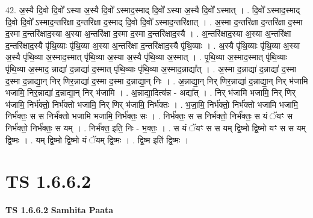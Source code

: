 \documentclass[17pt]{extarticle}
\begin{document}
42. अ॒स्यै दि॒वो दि॒वो᳚ ऽस्या अ॒स्यै दि॒वो᳚ ऽस्माद॒स्माद् दि॒वो᳚ ऽस्या अ॒स्यै दि॒वो᳚ ऽस्मात् । . दि॒वो᳚ ऽस्माद॒स्माद् दि॒वो दि॒वो᳚ ऽस्माद॒न्तरि॑क्षा द॒न्तरि॑क्षा द॒स्माद् दि॒वो दि॒वो᳚ ऽस्माद॒न्तरि॑क्षात् । . अ॒स्मा द॒न्तरि॑क्षा द॒न्तरि॑क्षा द॒स्मा द॒स्मा द॒न्तरि॑क्षाद॒स्या अ॒स्या अ॒न्तरि॑क्षा द॒स्मा द॒स्मा द॒न्तरि॑क्षाद॒स्यै । . अ॒न्तरि॑क्षाद॒स्या अ॒स्या अ॒न्तरि॑क्षा द॒न्तरि॑क्षाद॒स्यै पृ॑थि॒व्याः पृ॑थि॒व्या अ॒स्या अ॒न्तरि॑क्षा द॒न्तरि॑क्षाद॒स्यै पृ॑थि॒व्याः । . अ॒स्यै पृ॑थि॒व्याः पृ॑थि॒व्या अ॒स्या अ॒स्यै पृ॑थि॒व्या अ॒स्माद॒स्मात् पृ॑थि॒व्या अ॒स्या अ॒स्यै पृ॑थि॒व्या अ॒स्मात् । . पृ॒थि॒व्या अ॒स्माद॒स्मात् पृ॑थि॒व्याः पृ॑थि॒व्या अ॒स्माद॒ न्नाद्या॑ द॒न्नाद्या॑ द॒स्मात् पृ॑थि॒व्याः पृ॑थि॒व्या अ॒स्माद॒न्नाद्या᳚त् । . अ॒स्मा द॒न्नाद्या॑ द॒न्नाद्या॑ द॒स्मा द॒स्मा द॒न्नाद्या॒न् निर् णिर॒न्नाद्या॑ द॒स्मा द॒स्मा द॒न्नाद्या॒न् निः । . अ॒न्नाद्या॒न् निर् णिर॒न्नाद्या॑ द॒न्नाद्या॒न् निर् भ॑जामि भजामि॒ निर॒न्नाद्या॑ द॒न्नाद्या॒न् निर् भ॑जामि । . अ॒न्नाद्या॒दित्य॑न्न - अद्या᳚त् । . निर् भ॑जामि भजामि॒ निर् णिर् भ॑जामि॒ निर्भ॑क्तो॒ निर्भ॑क्तो भजामि॒ निर् णिर् भ॑जामि॒ निर्भ॑क्तः । . भ॒जा॒मि॒ निर्भ॑क्तो॒ निर्भ॑क्तो भजामि भजामि॒ निर्भ॑क्तः॒ स स निर्भ॑क्तो भजामि भजामि॒ निर्भ॑क्तः॒ सः । . निर्भ॑क्तः॒ स स निर्भ॑क्तो॒ निर्भ॑क्तः॒ स यं ॅयꣳ स निर्भ॑क्तो॒ निर्भ॑क्तः॒ स यम् । . निर्भ॑क्त॒ इति॒ निः - भ॒क्तः॒ । . स यं ॅयꣳ स स यम् द्वि॒ष्मो द्वि॒ष्मो यꣳ स स यम् द्वि॒ष्मः । . यम् द्वि॒ष्मो द्वि॒ष्मो यं ॅयम् द्वि॒ष्मः । . द्वि॒ष्म इति॑ द्वि॒ष्मः । \newline
\pagebreak
{}
\section*{ TS 1.6.6.2 }

\textbf{TS 1.6.6.2 } \newline
\textbf{Samhita Paata} \newline
\end{document}
